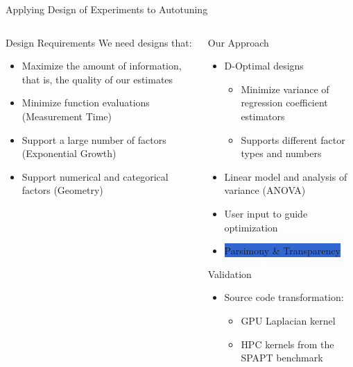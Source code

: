 \documentclass[10pt, compress, aspectratio=169, xcolor={table,usenames,dvipsnames}]{beamer}
\begin{document}
\begin{frame}[label={sec:org4a28eea}]{Applying Design of Experiments to Autotuning}
\begin{columns}
\begin{column}{0.45\columnwidth}
\begin{block}{Design Requirements}
\vspace{.7em}
We need designs that:

\begin{itemize}
\item \alert{Maximize} the amount of information, that is, the \alert{quality of our estimates}
\item Minimize function evaluations (\alert{Measurement Time})
\item Support a large number of factors (\alert{Exponential Growth})
\item Support numerical and categorical factors (\alert{Geometry})
\end{itemize}
\end{block}
\end{column}

\begin{column}{0.55\columnwidth}
\begin{block}{Our Approach}
\begin{itemize}
\item \alert{D-Optimal  designs}
\begin{itemize}
\item Minimize \alert{variance} of \alert{regression coefficient estimators}
\item Supports different factor \alert{types} and \alert{numbers}
\end{itemize}
\item \alert{Linear model} and \alert{analysis of variance} (\alert{ANOVA})
\item \alert{User input} to guide optimization
\item \colorbox{Highlight}{\alert{Parsimony} \& \alert{Transparency}}
\end{itemize}

\begin{block}{Validation}
\begin{itemize}
\item \alert{Source code transformation}:
\begin{itemize}
\item \alert{GPU Laplacian} kernel
\item HPC kernels from the \alert{SPAPT benchmark}
\end{itemize}
\end{itemize}
\end{block}
\end{block}
\end{column}
\end{columns}
\end{frame}
\end{document}
